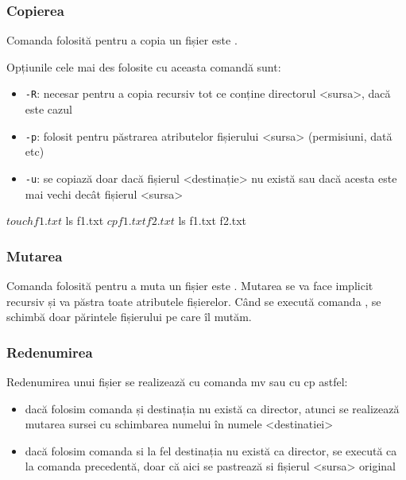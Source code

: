 \subsubsection{Copierea}
\label{sec:file-system-file-cp}

Comanda folosită pentru a copia un fișier este .

Opțiunile cele mai des folosite cu aceasta comandă sunt:

\begin{itemize}
	\item \texttt{-R}: necesar pentru a copia recursiv tot ce conține
		directorul <sursa>, dacă este cazul
	\item \texttt{-p}: folosit pentru păstrarea atributelor fișierului <sursa>
		(permisiuni, dată etc)
	\item \texttt{-u}: se copiază doar dacă fișierul <destinație> nu există sau
		dacă acesta este mai vechi decât fișierul <sursa>
\end{itemize}

\begin{screen}
$ touch f1.txt
$ ls
f1.txt
$ cp f1.txt f2.txt
$ ls
f1.txt  f2.txt
\end{screen}

\subsubsection{Mutarea}
\label{sec:file-system-file-mv}

Comanda folosită pentru a muta un fișier este . Mutarea se va face implicit recursiv și va păstra toate
atributele fișierelor. Când se execută  comanda , se schimbă doar
părintele fișierului pe care îl mutăm.


\subsubsection{Redenumirea}
\label{sec:file-system-file-rename}

Redenumirea unui fișier se realizează cu comanda mv sau cu cp astfel:

\begin{itemize}
	\item dacă folosim comanda  și destinația
		nu există ca director, atunci se realizează mutarea sursei cu
		schimbarea numelui în numele <destinatiei>
	\item dacă folosim comanda  si la fel
		destinația nu există ca director, se execută ca la comanda
		precedentă, doar că aici se pastrează si fișierul <sursa>
		original
\end{itemize}

